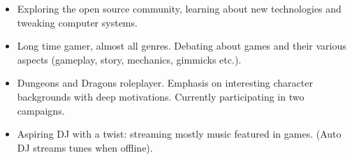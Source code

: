     \begin{itemize}
		\item Exploring the open source community, learning about new technologies and tweaking computer systems.

		\item Long time gamer, almost all genres. Debating about games and their various aspects (gameplay, story, mechanics, gimmicks etc.). 

		\item Dungeons and Dragons roleplayer. Emphasis on interesting character backgrounds with deep motivations. Currently participating in two campaigns.
		
		\item Aspiring DJ with a twist: streaming mostly music featured in games.  (Auto DJ streams tunes when offline).
	\end{itemize}